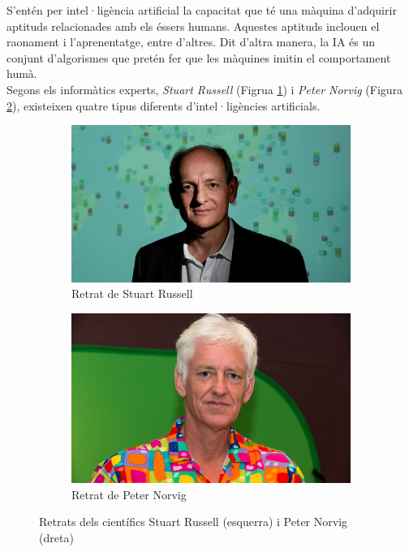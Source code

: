 \documentclass[a4paper,12pt]{report}
\begin{document}
S'entén per intel·ligència artificial la capacitat que té una màquina d'adquirir aptituds relacionades amb els éssers humans. Aquestes aptituds inclouen el raonament i l'aprenentatge, entre d'altres. Dit d'altra manera, la IA és un conjunt d'algorismes que pretén fer que les màquines imitin el comportament humà.\\
Segons els informàtics experts, \textit{Stuart Russell} (Figrua \ref{fig:russell}) i \textit{Peter Norvig} (Figura \ref{fig:norvig}), existeixen quatre tipus diferents d'intel·ligències artificials.
\begin{figure}[h!]
    \centering
    \begin{subfigure}[b]{0.48\linewidth}
        \includegraphics[width=\linewidth]{images/russell-aqua.jpg}
        \caption{Retrat de Stuart Russell}
        \label{fig:russell}
    \end{subfigure}
    \begin{subfigure}[b]{0.45\linewidth}
        \includegraphics[width=\linewidth]{images/peter_norvig_speaking_at_university_of_california_berkeley_2013.jpg}
        \caption{Retrat de Peter Norvig}
        \label{fig:norvig}
    \end{subfigure}
    \caption{Retrats dels científics Stuart Russell (esquerra) i Peter Norvig (dreta)}
    \label{fig:StuartNorvig}
\end{figure}
\end{document}
